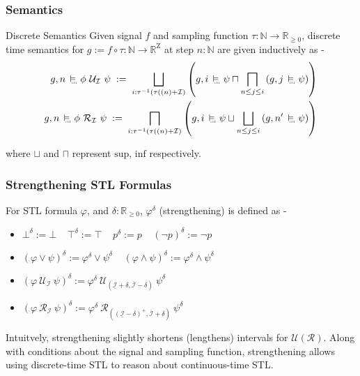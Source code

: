 \documentclass{beamer}
\newcommand{\typeTime}{\mathbb{R}_{\geq 0}}
\newcommand{\typeReal}{\mathbb{R}}
\newcommand{\typeNat}{\mathbb{N}}
\newcommand{\until}{\mathcal{U}}
\newcommand{\release}{\mathcal{R}}
\newcommand{\interval}{\mathcal{I}}
\newcommand{\Z}{\text{Z}}
\newcommand{\cont}{\raisebox{-0.1ex}{\scalebox{0.25}{\textrm{CNT}}}}
\newcommand{\contSatisfy}{\ \stackMath\stackunder[0pt]{\vDash}{\hspace*{0.3em}\cont}\ }
\newcommand{\robustAssign}{\; := \;}
\begin{document}
\begin{frame}
    \frametitle{Semantics}
    \begin{block}{Discrete Semantics}
        Given signal $f$ and sampling function $\tau : \typeNat
        \to \typeTime$, discrete time semantics for $g := f \circ \tau : \typeNat
        \to  \typeReal^{\Z}$ at step $n:\typeNat$ are given inductively as -
        \begin{align*}
            g, n \contSatisfy \phi\ \until_{\interval}\ \psi
            \robustAssign \bigsqcup_{i: \tau^{-1}(\tau((n) +\interval)}\left( g, i \contSatisfy \psi
           \sqcap \bigsqcap_{n \leq j \leq i} \left( g, j \contSatisfy \psi
            \right ) \right) \\
            g, n \contSatisfy \phi\ \release_{\interval}\ \psi
           \robustAssign \bigsqcap_{i: \tau^{-1}(\tau((n) +\interval)} \left( g, i \contSatisfy \psi
           \sqcup \bigsqcup_{n \leq j \leq i} \left( g, n' \contSatisfy \psi
            \right ) \right)
        \end{align*}
    \end{block}
    where $\sqcup$ and $\sqcap$ represent $\text{sup}$, $\text{inf}$ respectively.
\end{frame}

\begin{frame}
    \frametitle{Strengthening STL Formulas}
    For STL formula $\varphi$, and $\delta : \typeTime$,
    $\varphi^{\delta}$ (strengthening) is defined as -
    \begin{itemize}
        \item $\bot^{\delta} := \bot \;\;\;\; \top^{\delta} := \top   \;\;\;\; p^{\delta} := p
            \;\;\;\; (\neg p)^{\delta} := \neg p$
        \item $(\varphi \vee \psi)^{\delta} := \varphi^{\delta} \vee \psi^{\delta}
            \;\;\;\; (\varphi \wedge \psi)^{\delta} := \varphi^{\delta} \wedge \psi^{\delta}$
        \item $(\varphi\ \until_{\interval}\ \psi)^{\delta} := \varphi^{\delta} \
            \until_{\left (\underline{\interval} + \delta, \overline{\interval}
            - \delta \right)}\ \psi^{\delta}$
        \item $(\varphi\ \release_{\interval}\ \psi)^{\delta} := \varphi^{\delta} \
            \release_{\left ((\underline{\interval} - \delta)^{+}, \overline{\interval}
            + \delta \right)}\ \psi^{\delta}$
    \end{itemize}
    Intuitvely, strengthening slightly shortens (lengthens) intervals
    for $\until (\release) $. Along with conditions about the signal
    and sampling function, strengthening allows using discrete-time
    STL to reason about continuous-time STL.
\end{frame}
\end{document}

